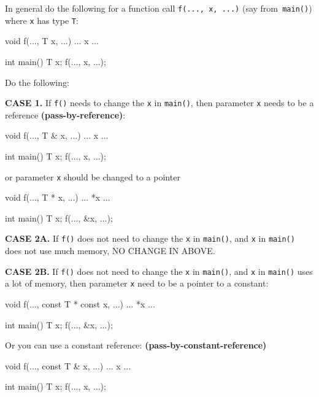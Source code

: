 In general do the following for a function call \texttt{f(..., x, ...)} (say from\texttt{ main()}) where \texttt{x} has type \texttt{T}:

\begin{consolethree}[escapeinside=||]
void f(..., T x, ...)
{
    ... x ...
}

int main()
{
    T x;
    f(..., x, ...);
}
\end{consolethree}
Do the following:

\textbf{CASE 1.} If \texttt{f()} needs to change the \texttt{x} in \texttt{main()}, then parameter \texttt{x} needs to be a reference \textbf{(pass-by-reference)}:

\begin{consolethree}[escapeinside=||]
void f(..., T & x, ...)
{
    ... x ...
}

int main()
{
    T x;
    f(..., x, ...);
}
\end{consolethree}
or parameter \texttt{x} should be changed to a pointer

\begin{consolethree}[escapeinside=||]
void f(..., T * x, ...)
{
    ... *x ...
}

int main()
{
    T x;
    f(..., &x, ...);
}
\end{consolethree}
\textbf{CASE 2A.} If \texttt{f()} does not need to change the \texttt{x} in \texttt{main()}, and \texttt{x} in \texttt{main()} does not use much memory, NO CHANGE IN ABOVE.

\textbf{CASE 2B.} If \texttt{f()} does not need to change the \texttt{x} in \texttt{main()}, and \texttt{x} in \texttt{main()} uses a lot of memory, then parameter \texttt{x} need to be a pointer to a constant:

\begin{consolethree}[escapeinside=||]
void f(..., const T * const x, ...)
{
    ... *x ...
}

int main()
{
    T x;
    f(..., &x, ...);
}
\end{consolethree}
Or you can use a constant reference:
\textbf{(pass-by-constant-reference)}

\begin{consolethree}[escapeinside=||]
void f(..., const T & x, ...)
{
    ... x ...
}

int main()
{
    T x;
    f(..., x, ...);
}
\end{consolethree}

